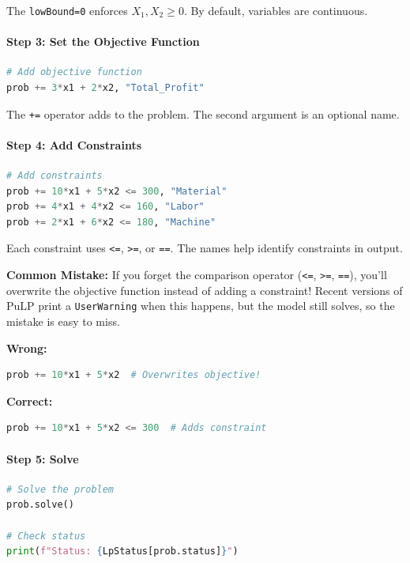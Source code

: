 The \texttt{lowBound=0} enforces $X_1, X_2 \geq 0$. By default, variables are continuous.

\paragraph{Step 3: Set the Objective Function}

\begin{lstlisting}[language=Python]
# Add objective function
prob += 3*x1 + 2*x2, "Total_Profit"
\end{lstlisting}

The \texttt{+=} operator adds to the problem. The second argument is an optional name.

\paragraph{Step 4: Add Constraints}

\begin{lstlisting}[language=Python]
# Add constraints
prob += 10*x1 + 5*x2 <= 300, "Material"
prob += 4*x1 + 4*x2 <= 160, "Labor"
prob += 2*x1 + 6*x2 <= 180, "Machine"
\end{lstlisting}

Each constraint uses \texttt{<=}, \texttt{>=}, or \texttt{==}. The names help identify constraints in output.

\begin{warn}
\textbf{Common Mistake:} If you forget the comparison operator (\texttt{<=}, \texttt{>=}, \texttt{==}), you'll overwrite the objective function instead of adding a constraint! Recent versions of PuLP print a \texttt{UserWarning} when this happens, but the model still solves, so the mistake is easy to miss.

\textbf{Wrong:}
\begin{lstlisting}[language=Python]
prob += 10*x1 + 5*x2  # Overwrites objective!
\end{lstlisting}

\textbf{Correct:}
\begin{lstlisting}[language=Python]
prob += 10*x1 + 5*x2 <= 300  # Adds constraint
\end{lstlisting}
\end{warn}

\paragraph{Step 5: Solve}

\begin{lstlisting}[language=Python]
# Solve the problem
prob.solve()

# Check status
print(f"Status: {LpStatus[prob.status]}")
\end{lstlisting}


